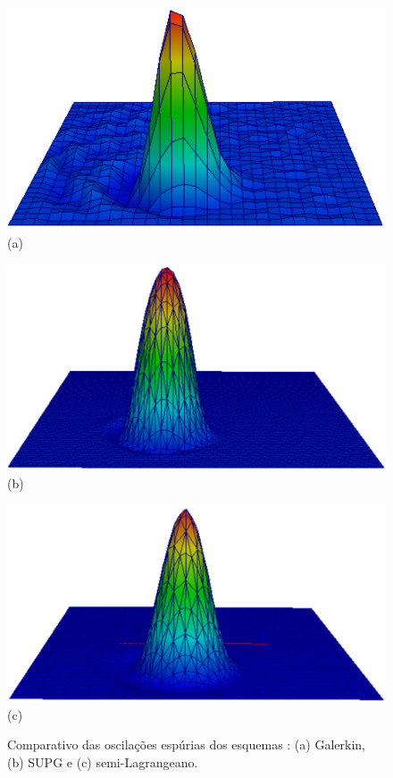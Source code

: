 \begin{figure}[H]
     \begin{minipage}{.32\linewidth}
      \centering
      \includegraphics[scale=0.15]{./02_chaps/cap_review/figure/galerkin.png}\\
      (a)
     \end{minipage}%
     \begin{minipage}{.32\linewidth}
      \centering
      \includegraphics[scale=0.15]{./02_chaps/cap_review/figure/SUPG.png}\\
      (b)
     \end{minipage}%
     \begin{minipage}{.35\linewidth}
      \centering
      \includegraphics[scale=0.15]{./02_chaps/cap_review/figure/semilagrangian.png}\\
      (c)
     \end{minipage}%
     \medskip
     \caption{Comparativo das oscilações espúrias dos esquemas \cite{silva2011}:
              (a) Galerkin,
              (b) SUPG e 
              (c) semi-Lagrangeano.}
     \label{procedimentos oscilacoes espurias}
\end{figure}
